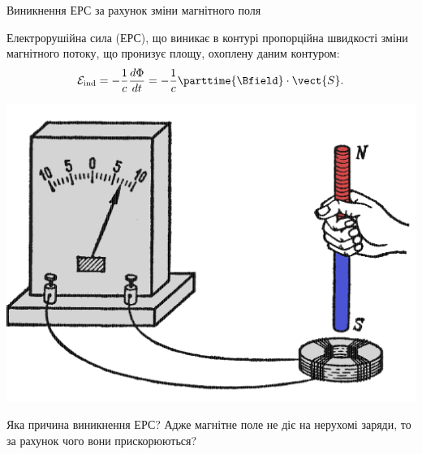 \documentclass[onlytextwidth]{beamer}
\begin{document}



\begin{frame}{Виникнення ЕРС за рахунок зміни магнітного поля}{}
	\begin{block}{}\justifying
		Електрорушійна сила (ЕРС), що виникає в контурі пропорційна швидкості зміни магнітного потоку, що пронизує площу, охоплену даним контуром:
		\begin{equation*}
			\mathcal{E}_\text{ind} =  -\frac1c \frac{d\Phi}{dt} = -\frac1c \parttime{\Bfield} \cdot \vect{S}.
		\end{equation*}
	\end{block}
	\begin{center}
		\begin{pict}
			\includegraphics[width=0.5\linewidth]{Field_change}
		\end{pict}
	\end{center}
	\begin{alertblock}{}
		Яка причина виникнення ЕРС? Адже магнітне поле не діє на нерухомі заряди, то за рахунок чого вони прискорюються?
	\end{alertblock}
\end{frame}
\end{document}
